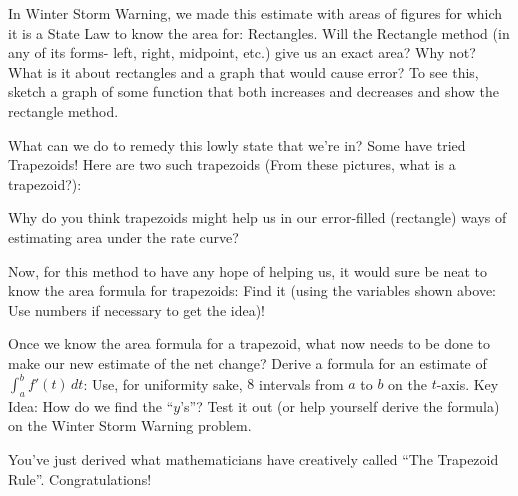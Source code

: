 \documentclass{ximera}
\begin{document}
     In Winter Storm Warning, we made this estimate with areas of figures for which it is a State Law to know the area for: Rectangles.  Will the Rectangle method (in any of its forms- left, right, midpoint, etc.) give us an exact area?  Why not? What is it about rectangles and a graph that would cause error?  To see this, sketch a graph of some function that both increases and decreases and show the rectangle method.
     
     What can we do to remedy this lowly state that we're in?  Some have tried Trapezoids!  Here are two such trapezoids (From these pictures, what is a trapezoid?):
    \begin{image}
    \end{image}
    
Why do you think trapezoids might help us in our error-filled (rectangle) ways of estimating area under the rate curve?

Now, for this method to have any hope of helping us, it would sure be neat to know the area formula for trapezoids:  Find it (using the variables shown above:  Use numbers if necessary to get the idea)!
       
Once we know the area formula for a trapezoid, what now needs to be done to make our new estimate of the net change?  Derive a formula for an estimate of  $\int_a^b f'(t)\, dt$:  Use, for uniformity sake, $8$ intervals from $a$ to $b$ on the $t$-axis.  Key Idea:  How do we find the ``$y$'s''?  Test it out (or help yourself derive the formula) on the Winter Storm Warning problem.

       You've just derived what mathematicians have creatively called ``The Trapezoid Rule''.   Congratulations!
\end{document}
